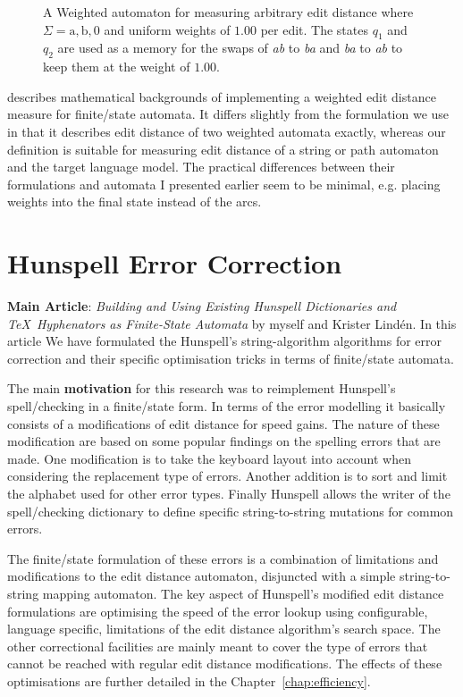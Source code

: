 \documentclass[officiallayout]{unihelcompling}
\begin{document}
\begin{figure}
    \caption{A Weighted automaton for measuring arbitrary edit distance where
        $\Sigma = {\mathrm{a}, \mathrm{b}, 0}$ and uniform weights of $1.00$ per
        edit. The states $q_1$ and $q_2$ are used as a memory for
        the swaps of \emph{ab} to \emph{ba} and \emph{ba} to \emph{ab} to
        keep them at the weight of $1.00$. \label{fig:edit-weighted}}
\end{figure}

\citet{mohri2003edit} describes mathematical backgrounds of implementing a
weighted edit distance measure for finite\-/state automata. It differs slightly
from the formulation we use in that it describes edit distance of two weighted
automata exactly, whereas our definition is suitable for measuring edit
distance of a string or path automaton and the target language model. The
practical differences between their formulations and automata I presented
earlier seem to be minimal, e.g. placing weights into the final state instead
of the arcs.

\section{Hunspell Error Correction}
\label{sec:Hunspell-error}

\textbf{Main Article}: \emph{Building and Using Existing Hunspell Dictionaries
and \TeX\ Hyphenators as Finite-State Automata} by myself and Krister Lindén.
In this article We have formulated the Hunspell's string-algorithm algorithms for
error correction and their specific optimisation tricks in terms of
finite\-/state automata.

The main \textbf{motivation} for this research was to reimplement Hunspell's
spell\-/checking in a finite\-/state form. In terms of the  error modelling it
basically consists of a modifications of edit distance for speed gains. The
nature of these modification are based on some popular findings on the spelling
errors that are made. One modification is to take the keyboard layout into
account when considering the replacement type of errors. Another addition is to
sort and limit the alphabet used for other error types. Finally Hunspell allows
the writer of the spell\-/checking dictionary to define specific
string-to-string mutations for common errors.

The finite\-/state formulation of these errors is a combination of limitations
and modifications to the edit distance automaton, disjuncted with a simple
string-to-string mapping automaton. The key aspect of Hunspell's modified
edit distance formulations are optimising the speed of the error lookup using
configurable, language specific, limitations of the edit distance algorithm's
search space. The other correctional facilities are mainly meant to cover the
type of errors that cannot be reached with regular edit distance modifications.
The effects of these optimisations are further detailed in the 
Chapter~\ref{chap:efficiency}.
\end{document}
